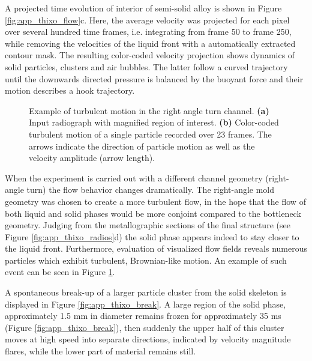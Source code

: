A projected time evolution of interior of semi-solid alloy is shown in Figure \ref{fig:app_thixo_flow}c. Here, the average velocity was projected for each pixel over several hundred time frames, i.e. integrating from frame 50 to frame 250, while removing the velocities of the liquid front with a automatically extracted contour mask. The resulting color-coded
velocity projection shows dynamics of solid particles, clusters and air bubbles. The latter follow a curved trajectory until the downwards directed pressure is balanced by the buoyant force and their motion describes a hook trajectory.


\begin{figure}[ht]
  \centerline{
    \mbox{}
    \mbox{}
  }  
  \caption{Example of turbulent motion in the right angle turn channel. \textbf{(a)} Input radiograph with magnified region of
interest. \textbf{(b)} Color-coded turbulent motion of a single particle recorded over 23 frames. The arrows
indicate the direction of particle motion as well as the velocity amplitude (arrow length).}
  \label{fig:app_thixo_turbulence}
\end{figure}

When the experiment is carried out with a different channel geometry (right-angle turn) the flow behavior changes dramatically. The right-angle mold geometry was chosen to create a more turbulent flow, in the hope that the flow of both liquid and solid phases would be more conjoint compared to the bottleneck geometry. 
Judging from the metallographic sections of the final structure (see Figure \ref{fig:app_thixo_radios}d) the solid phase appears indeed to stay closer to the liquid front. Furthermore, evaluation of visualized flow fields reveals numerous particles which exhibit turbulent, Brownian-like motion. An example of such event can be seen in Figure \ref{fig:app_thixo_turbulence}. 


A spontaneous break-up of a larger particle cluster from the solid skeleton is displayed in Figure \ref{fig:app_thixo_break}. A large region of the solid phase, approximately 1.5 mm in diameter remains frozen for approximately
35 ms (Figure \ref{fig:app_thixo_break}), then suddenly the upper half of this cluster moves at high speed into separate directions, indicated by velocity magnitude flares, while the lower part of material remains still.



